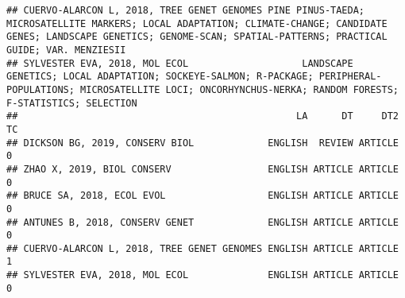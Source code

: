 \documentclass[]{article}
\begin{document}
\begin{verbatim}
## CUERVO-ALARCON L, 2018, TREE GENET GENOMES PINE PINUS-TAEDA; MICROSATELLITE MARKERS; LOCAL ADAPTATION; CLIMATE-CHANGE; CANDIDATE GENES; LANDSCAPE GENETICS; GENOME-SCAN; SPATIAL-PATTERNS; PRACTICAL GUIDE; VAR. MENZIESII
## SYLVESTER EVA, 2018, MOL ECOL                    LANDSCAPE GENETICS; LOCAL ADAPTATION; SOCKEYE-SALMON; R-PACKAGE; PERIPHERAL-POPULATIONS; MICROSATELLITE LOCI; ONCORHYNCHUS-NERKA; RANDOM FORESTS; F-STATISTICS; SELECTION
##                                                 LA      DT     DT2 TC
## DICKSON BG, 2019, CONSERV BIOL             ENGLISH  REVIEW ARTICLE  0
## ZHAO X, 2019, BIOL CONSERV                 ENGLISH ARTICLE ARTICLE  0
## BRUCE SA, 2018, ECOL EVOL                  ENGLISH ARTICLE ARTICLE  0
## ANTUNES B, 2018, CONSERV GENET             ENGLISH ARTICLE ARTICLE  0
## CUERVO-ALARCON L, 2018, TREE GENET GENOMES ENGLISH ARTICLE ARTICLE  1
## SYLVESTER EVA, 2018, MOL ECOL              ENGLISH ARTICLE ARTICLE  0

\end{verbatim}
\end{document}
